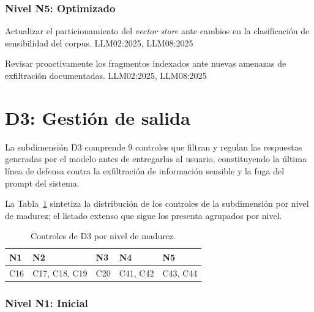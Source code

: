 \subsubsection*{Nivel N5: Optimizado}

  {Actualizar el particionamiento del \textit{vector store} ante cambios en la clasificación de sensibilidad del corpus.}
  {LLM02:2025, LLM08:2025}

  {Revisar proactivamente los fragmentos indexados ante nuevas amenazas de exfiltración documentadas.}
  {LLM02:2025, LLM08:2025}

\section{D3: Gestión de salida}
\label{sec:controles-d3}

La subdimensión D3 comprende 9 controles que filtran y regulan las respuestas generadas por el modelo antes de entregarlas al usuario, constituyendo la última línea de defensa contra la exfiltración de información sensible y la fuga del prompt del sistema.

La Tabla~\ref{tab:niveles-d3} sintetiza la distribución de los controles de la subdimensión por nivel de madurez; el listado extenso que sigue los presenta agrupados por nivel.

\begin{table}[H]
  \centering
  \caption{Controles de D3 por nivel de madurez.}
  \label{tab:niveles-d3}
  \begin{tabularx}{\textwidth}{@{} >{\raggedright\arraybackslash}X >{\raggedright\arraybackslash}X >{\raggedright\arraybackslash}X >{\raggedright\arraybackslash}X >{\raggedright\arraybackslash}X @{}}
    \toprule
    \cellcolor{level-n1!15}\textbf{N1} & \cellcolor{level-n2!15}\textbf{N2} & \cellcolor{level-n3!15}\textbf{N3} & \cellcolor{level-n4!15}\textbf{N4} & \cellcolor{level-n5!15}\textbf{N5} \\
    \midrule
    C16 & C17, C18, C19 & C20 & C41, C42 & C43, C44 \\
    \bottomrule
  \end{tabularx}
\end{table}

\subsubsection*{Nivel N1: Inicial}

